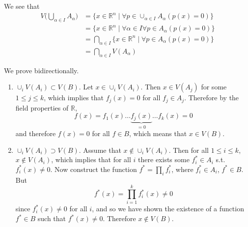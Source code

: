   \begin{solution}[b]
    We see that 
    \begin{align}
      V \bigg( \bigcup_{\alpha \in I} A_\alpha \bigg) & = \big\{ x \in \mathbb{R}^n \mid \forall p \in \cup_{\alpha \in I} A_\alpha ( p(x) = 0 )\big\} \\ 
                                                      & = \big\{ x \in \mathbb{R}^n \mid \forall \alpha \in I \forall p \in A_\alpha (p(x) = 0)  \big\} \\
                                                      & = \bigcap_{\alpha \in I} \big\{ x \in \mathbb{R}^n \mid \forall p \in A_\alpha (p(x) = 0) \big\} \\
                                                      & = \bigcap_{\alpha \in I} V(A_\alpha)
    \end{align}
  \end{solution}
  \begin{solution}[c]
    We prove bidirectionally. 
    \begin{enumerate}
      \item $\cup_{i} V(A_i) \subset V(B)$. Let $x \in \cup_i V(A_i)$. Then $x \in V(A_j)$ for some $1 \leq j \leq k$, which implies that $f_j (x) = 0$ for all $f_j \in A_j$. Therefore by the field properties of $\mathbb{R}$, 
      \begin{equation}
        f(x) = f_1 (x) \ldots \underbrace{f_j(x)}_{=0} \ldots f_k (x) = 0 
      \end{equation} 
      and therefore $f(x) = 0$ for all $f \in B$, which means that $x \in V(B)$. 

      \item $\cup_i V(A_i) \supset V(B)$. Assume that $x \not\in \cup_i V(A_i)$. Then for all $1 \leq i \leq k$, $x \not\in V(A_i)$, which implies that for all $i$ there exists some $f_i^{\ast} \in A_i$ s.t. $f_i^\ast (x) \neq 0$. Now construct the function $f^\ast = \prod_i f_i^\ast$, where $f_i^\ast \in A_i$, $f^\ast \in B$. But 
      \begin{equation}
        f^\ast (x) = \prod_{i=1}^k f_i^\ast (x) \neq 0
      \end{equation}
      since $f_i^\ast (x) \neq 0$ for all $i$, and so we have shown the existence of a function $f^\ast \in B$ such that $f^\ast (x) \neq 0$. Therefore $x \not\in V(B)$. 
    \end{enumerate}
  \end{solution}
